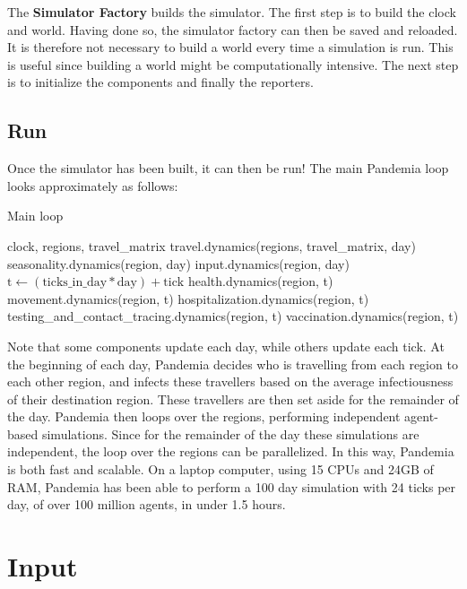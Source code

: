 \documentclass[10pt,letterpaper]{article}
\begin{document}
The \textbf{Simulator Factory} builds the simulator. The first step is to build the clock and world. Having done so, the simulator factory can then be saved and reloaded. It is therefore not necessary to build a world every time a simulation is run. This is useful since building a world might be computationally intensive. The next step is to initialize the components and finally the reporters.

\subsection{Run}

Once the simulator has been built, it can then be run! The main Pandemia loop looks approximately as follows:

\begin{algorithm}
\caption{Main loop}\label{alg:mainloop}
\begin{algorithmic}
\Require clock, regions, travel{\_}matrix
\State travel.dynamics(regions, travel{\_}matrix, day)
\State seasonality.dynamics(region, day)
\State input.dynamics(region, day)
\State $\text{t} \gets (\text{ticks{\_}in{\_}day} * \text{day}) + \text{tick}$
\State health.dynamics(region, t)
\State movement.dynamics(region, t)
\State hospitalization.dynamics(region, t)
\EndFor
\State testing{\_}and{\_}contact{\_}tracing.dynamics(region, t)
\State vaccination.dynamics(region, t)
\EndFor
\EndFor
\end{algorithmic}
\end{algorithm}

Note that some components update each day, while others update each tick. At the beginning of each day, Pandemia decides who is travelling from each region to each other region, and infects these travellers based on the average infectiousness of their destination region. These travellers are then set aside for the remainder of the day. Pandemia then loops over the regions, performing independent agent-based simulations. Since for the remainder of the day these simulations are independent, the loop over the regions can be parallelized. In this way, Pandemia is both fast and scalable. On a laptop computer, using 15 CPUs and 24GB of RAM, Pandemia has been able to perform a 100 day simulation with 24 ticks per day, of over 100 million agents, in under 1.5 hours.

\section{Input}\label{sec:input}
\end{document}
